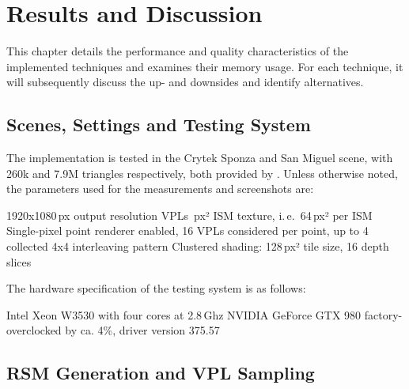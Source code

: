 

\chapter{Results and Discussion}
\label{chap:results}

This chapter details the performance and quality characteristics of the implemented techniques and  examines their memory usage. For each technique, it will subsequently discuss the up- and downsides and identify alternatives.

\section{Scenes, Settings and Testing System}
\label{sec:results:settings}

The implementation is tested in the Crytek Sponza and San Miguel scene, with 260k and 7.9M triangles respectively, both provided by \citet{McGuire2011Data}. Unless otherwise noted, the parameters used for the measurements and screenshots are:
\begin{outline}
    \1 1920x1080\,px output resolution
     VPLs
    \,px² ISM texture, i.\,e.\ 64\,px² per ISM
    \1 Single-pixel point renderer enabled, 16 VPLs considered per point, up to 4 collected
    \1 4x4 interleaving pattern
    \1 Clustered shading: 128\,px² tile size, 16 depth slices
\end{outline}

\noindent
The hardware specification of the testing system is as follows:
\begin{outline}
    \1 Intel Xeon W3530 with four cores at 2.8\,Ghz
    \1 NVIDIA GeForce GTX 980 factory-overclocked by ca. 4\%, driver version 375.57
\end{outline}


\section{RSM Generation and VPL Sampling}
\label{sec:results:RsmAndVplSampling}

